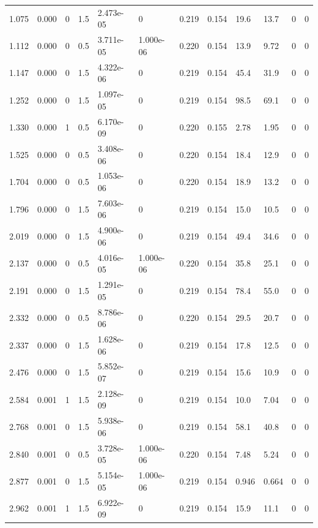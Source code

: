\documentclass[preview]{standalone}
\begin{document}
{{\begin{tabular}{L{1.2cm}C{1.2cm} C{0.3cm}C{0.5cm} C{1.4cm}C{1.4cm} C{1.4cm}C{1.4cm} C{1.6cm}C{1.6cm} C{1.6cm}C{1.6cm}}
  1.075  &  0.000  & 0     & 1.5 &  2.473e-05  & 0  &  0.219&   0.154& 19.6 & 13.7   &  0 & 0  \\ 
  1.112  &  0.000  & 0     & 0.5 &  3.711e-05  & 1.000e-06  &  0.220&   0.154& 13.9 & 9.72   &  0 & 0  \\ 
  1.147  &  0.000  & 0     & 1.5 &  4.322e-06  & 0  &  0.219&   0.154& 45.4 & 31.9   &  0 & 0  \\ 
  1.252  &  0.000  & 0     & 1.5 &  1.097e-05  & 0  &  0.219&   0.154& 98.5 & 69.1   &  0 & 0  \\ 
  1.330  &  0.000  & 1     & 0.5 &  6.170e-09  & 0  &  0.220&   0.155& 2.78 & 1.95   &  0 & 0  \\ 
  1.525  &  0.000  & 0     & 0.5 &  3.408e-06  & 0  &  0.220&   0.154& 18.4 & 12.9   &  0 & 0  \\ 
  1.704  &  0.000  & 0     & 0.5 &  1.053e-06  & 0  &  0.220&   0.154& 18.9 & 13.2   &  0 & 0  \\ 
  1.796  &  0.000  & 0     & 1.5 &  7.603e-06  & 0  &  0.219&   0.154& 15.0 & 10.5   &  0 & 0  \\ 
  2.019  &  0.000  & 0     & 1.5 &  4.900e-06  & 0  &  0.219&   0.154& 49.4 & 34.6   &  0 & 0  \\ 
  2.137  &  0.000  & 0     & 0.5 &  4.016e-05  & 1.000e-06  &  0.220&   0.154& 35.8 & 25.1   &  0 & 0  \\ 
  2.191  &  0.000  & 0     & 1.5 &  1.291e-05  & 0  &  0.219&   0.154& 78.4 & 55.0   &  0 & 0  \\ 
  2.332  &  0.000  & 0     & 0.5 &  8.786e-06  & 0  &  0.220&   0.154& 29.5 & 20.7   &  0 & 0  \\ 
  2.337  &  0.000  & 0     & 1.5 &  1.628e-06  & 0  &  0.219&   0.154& 17.8 & 12.5   &  0 & 0  \\ 
  2.476  &  0.000  & 0     & 1.5 &  5.852e-07  & 0  &  0.219&   0.154& 15.6 & 10.9   &  0 & 0  \\ 
  2.584  &  0.001  & 1     & 1.5 &  2.128e-09  & 0  &  0.219&   0.154& 10.0 & 7.04   &  0 & 0  \\ 
  2.768  &  0.001  & 0     & 1.5 &  5.938e-06  & 0  &  0.219&   0.154& 58.1 & 40.8   &  0 & 0  \\ 
  2.840  &  0.001  & 0     & 0.5 &  3.728e-05  & 1.000e-06  &  0.220&   0.154& 7.48 & 5.24   &  0 & 0  \\ 
  2.877  &  0.001  & 0     & 1.5 &  5.154e-05  & 1.000e-06  &  0.219&   0.154& 0.946 & 0.664   &  0 & 0  \\ 
  2.962  &  0.001  & 1     & 1.5 &  6.922e-09  & 0  &  0.219&   0.154& 15.9 & 11.1   &  0 & 0  \\ 

\end{tabular}}}
\end{document}
